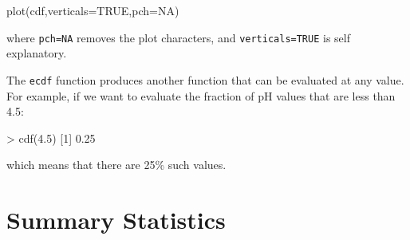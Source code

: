 \begin{enumerate}
\begin{script}[firstnumber=2]
plot(cdf,verticals=TRUE,pch=NA)
\end{script}

\noindent where \texttt{pch=NA} removes the plot characters, and
\texttt{verticals=TRUE} is self explanatory.

The \texttt{ecdf} function produces another function that can be
evaluated at any value. For example, if we want to evaluate the
fraction of pH values that are less than 4.5:

\begin{console}
> cdf(4.5)
[1] 0.25
\end{console}

\noindent which means that there are 25\% such values.

\end{enumerate}

\section{Summary Statistics}
\label{sec:R-summary-statistics}

